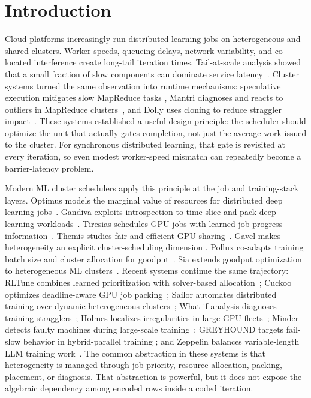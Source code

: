 \section{Introduction}

Cloud platforms increasingly run distributed learning jobs on heterogeneous
and shared clusters.  Worker speeds, queueing delays, network variability, and
co-located interference create long-tail iteration times.  Tail-at-scale
analysis showed that a small fraction of slow components can dominate service
latency~\cite{dean2013tail}.  Cluster systems turned the same observation into
runtime mechanisms: speculative execution mitigates slow MapReduce tasks
\cite{zaharia2008late}, Mantri diagnoses and reacts to outliers in
MapReduce clusters~\cite{ananthanarayanan2010mantri}, and Dolly uses cloning to
reduce straggler impact~\cite{ananthanarayanan2013dolly}.  These systems
established a useful design principle: the scheduler should optimize the unit
that actually gates completion, not just the average work issued to the
cluster.  For synchronous distributed learning, that gate is revisited at every
iteration, so even modest worker-speed mismatch can repeatedly become a
barrier-latency problem.

Modern ML cluster schedulers apply this principle at the job and training-stack
layers.  Optimus models the marginal value of resources for distributed deep
learning jobs~\cite{peng2018optimus}.  Gandiva exploits introspection to
time-slice and pack deep learning workloads~\cite{xiao2018gandiva}.  Tiresias
schedules GPU jobs with learned job progress information~\cite{gu2019tiresias}.
Themis studies fair and efficient GPU sharing~\cite{mahajan2020themis}.  Gavel
makes heterogeneity an explicit cluster-scheduling dimension
\cite{narayanan2020gavel}.  Pollux co-adapts training batch size and cluster
allocation for goodput~\cite{qiao2021pollux}.  Sia extends goodput
optimization to heterogeneous ML clusters~\cite{subramanya2023sia}.  Recent
systems continue the same trajectory: RLTune combines learned prioritization
with solver-based allocation~\cite{dongare2025rltune}; Cuckoo optimizes
deadline-aware GPU job packing~\cite{zhang2025cuckoo}; Sailor automates
distributed training over dynamic heterogeneous clusters~\cite{strati2025sailor};
What-if analysis diagnoses training stragglers~\cite{lin2025whatifstragglers};
Holmes localizes irregularities in large GPU fleets~\cite{yao2025holmes};
Minder detects faulty machines during large-scale training~\cite{deng2025minder};
GREYHOUND targets fail-slow behavior in hybrid-parallel training
\cite{wu2025greyhound}; and Zeppelin balances variable-length LLM training
work~\cite{chen2026zeppelin}.  The common abstraction in these systems is that
heterogeneity is managed through job priority, resource allocation, packing,
placement, or diagnosis.  That abstraction is powerful, but it does not expose
the algebraic dependency among encoded rows inside a coded iteration.

